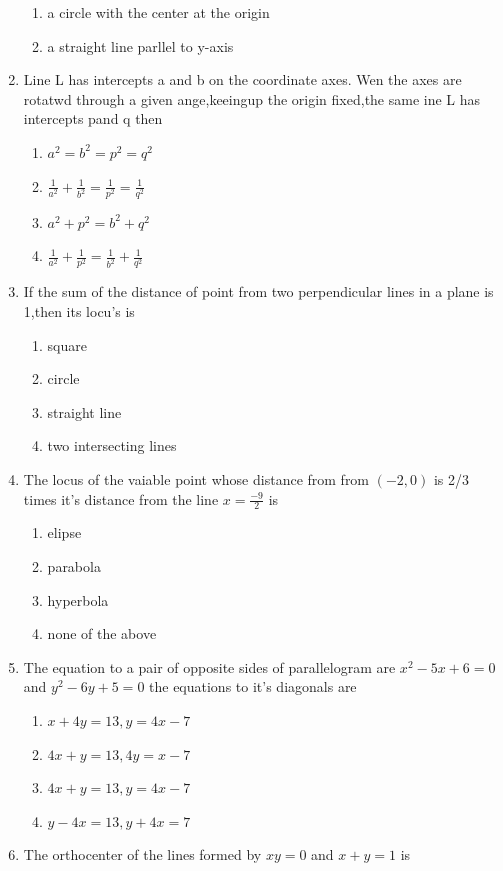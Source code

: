 \documentclass[12pt]{article}
\begin{document}
\begin{enumerate}
\begin{enumerate}
\item  a circle with the center at the origin 
\item  a straight line parllel to y-axis
\end{enumerate}
\item Line L has intercepts a and b on the coordinate axes. Wen the axes are rotatwd through a given ange,keeingup the origin fixed,the same ine L has intercepts  pand q then
\begin{enumerate}
\item  $a^2=b^2=p^2=q^2$ 
\item $\frac{1}{a^2} +\frac{1}{b^2}= \frac{1}{p^2}=\frac{1}{q^2}$ 
\item  $a^2+p^2=b^2+q^2$ 
\item $\frac{1}{a^2}+\frac{1}{p^2}=\frac{1}{b^2}+\frac{1}{q^2}$
\end{enumerate}
\item If the sum of the distance of point from two perpendicular lines in a plane is 1,then its locu's is 
\begin{enumerate}
\item square 
\item  circle 
\item  straight line  
\item two intersecting lines
\end{enumerate}
\item The locus of the vaiable point whose distance from from $(-2,0)$ is 2/3 times it's distance from the line $x=\frac{-9}{2}$ is
\begin{enumerate}
\item elipse 
\item  parabola  
\item  hyperbola  
\item  none of the above
\end{enumerate}
\item The equation to a pair of  opposite sides of parallelogram are $x^2-5x+6=0$ and $y^2-6y+5=0$ the equations to it's diagonals are
\begin{enumerate}
\item $x+4y=13, y=4x-7$  
\item   $4x+y=13, 4y=x-7$ 
\item   $4x+y=13, y=4x-7$
\item $y-4x=13,y+4x=7$ 
\end{enumerate}
\item The orthocenter of the lines formed by $xy=0$ and $x+y=1$ is
\begin{enumerate}

\end{enumerate}
\end{enumerate}
\end{document}
